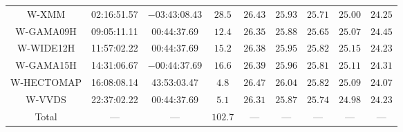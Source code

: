 \documentclass[]{pasj01}
\begin{document}
\begin{longtable}{ccccccccc}
  W-XMM & 02:16:51.57 & $-$03:43:08.43 & $28.5$ & $26.43$ & $25.93$ & $25.71$ & $25.00$ & $24.25$ \\
  W-GAMA09H & 09:05:11.11 & 00:44:37.69  & $12.4$ & $26.35$ & $25.88$ & $25.65$ & $25.07$ & $24.45$ \\
  W-WIDE12H & 11:57:02.22 & 00:44:37.69 & $15.2$ & $26.38$ & $25.95$ & $25.82$ & $25.15$ & $24.23$ \\
  W-GAMA15H & 14:31:06.67& $-$00:44:37.69  & $16.6$ & $26.39$ & $25.96$ & $25.81$ & $25.11$ & $24.31$ \\
  W-HECTOMAP & 16:08:08.14 & 43:53:03.47  & $4.8$ & $26.47$ & $26.04$ & $25.82$ & $25.09$ & $24.07$ \\
  W-VVDS & 22:37:02.22 & 00:44:37.69  & $5.1$ & $26.31$ & $25.87$ & $25.74$ & $24.98$ & $24.23$ \\
  \hline
  Total & --- & --- & $102.7$ & --- & --- & --- & --- & --- \\
  \hline
\end{longtable}
\end{document}

